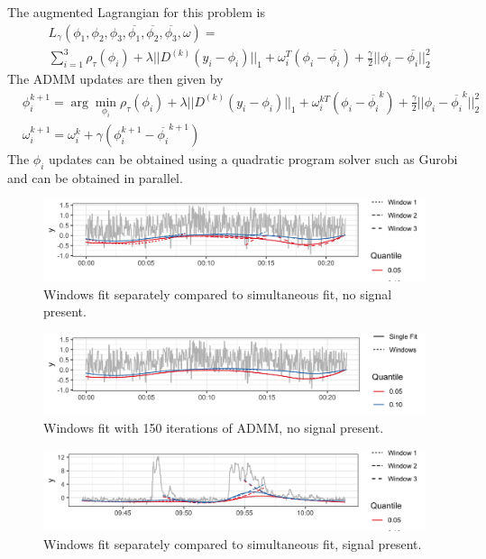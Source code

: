 \documentclass[12pt]{article}
\numberwithin{equation}{section}
\theoremstyle{plain}
\begin{document}
The augmented Lagrangian for this problem is 
\begin{align}
&L_\gamma(\phi_1,\phi_2, \phi_3, \overline{\phi_1}, \overline{\phi_2}, \overline{\phi_3}, \omega) = \\
&\sum_{i=1}^3 \rho_\tau(\phi_i) + \lambda||D^{(k)}(y_i-\phi_i)||_1 + \omega_i^T(\phi_i - \overline{\phi_i}) + \frac{\gamma}{2}||\phi_i - \overline{\phi_i}||_2^2
\end{align}
The ADMM updates are then given by
\begin{align}
&\phi_i^{k+1} = \arg\min_{\phi_i}\rho_\tau(\phi_i) + \lambda||D^{(k)}(y_i-\phi_i)||_1 + \omega_i^{kT}(\phi_i - \overline{\phi_i}^k) + \frac{\gamma}{2}||\phi_i - \overline{\phi_i}^k||_2^2\\
&\omega_i^{k+1} = \omega_i^{k} + \gamma(\phi_i^{k+1} - \overline{\phi_i}^{k+1})
\end{align}
The $\phi_i$ updates can be obtained using a quadratic program solver such as Gurobi and can be obtained in parallel. 

\pagebreak 

\begin{figure}[!h] 
	\caption{Windows fit separately compared to simultaneous fit, no signal present.}
	\includegraphics[width = \linewidth]{overlapping_windows.png}
\end{figure}

\begin{figure}[!h] 
	\caption{Windows fit with 150 iterations of ADMM, no signal present.}
	\includegraphics[width = \linewidth]{admm_windows.png}
\end{figure}

\begin{figure}[!h] 
	\caption{Windows fit separately compared to simultaneous fit, signal present.}
	\includegraphics[width = \linewidth]{overlapping_windows2.png}
\end{figure}
\end{document}
